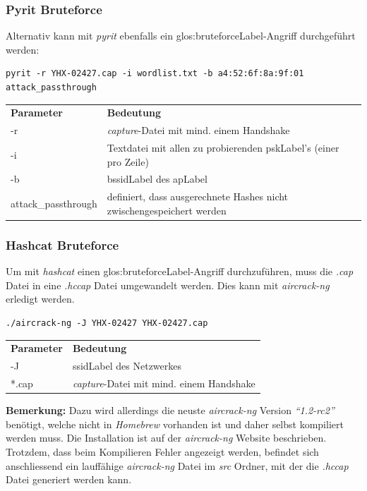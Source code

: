 \subsubsection{Pyrit Bruteforce}
Alternativ kann mit \textit{pyrit} ebenfalls ein \gls{glos:bruteforceLabel}-Angriff durchgeführt werden:
\begin{lstlisting}[style=lstStyleFramed]
pyrit -r YHX-02427.cap -i wordlist.txt -b a4:52:6f:8a:9f:01 attack_passthrough
\end{lstlisting}
\begin{tabular}{l l}
	\textbf{Parameter} & \textbf{Bedeutung}\\
	-r & \textit{capture}-Datei mit mind. einem Handshake\\
	-i	& Textdatei mit allen zu probierenden \gls{pskLabel}'s (einer pro Zeile)\\
	-b	& \gls{bssidLabel} des \gls{apLabel}\\
	attack\_passthrough & definiert, dass ausgerechnete Hashes nicht zwischengespeichert werden\\
\end{tabular}


\subsubsection{Hashcat Bruteforce}
Um mit \textit{hashcat} einen \gls{glos:bruteforceLabel}-Angriff durchzuführen, muss die \textit{.cap} Datei in eine \textit{.hccap} Datei umgewandelt werden. Dies kann mit \textit{aircrack-ng} erledigt werden.

\begin{lstlisting}[style=lstStyleFramed]
./aircrack-ng -J YHX-02427 YHX-02427.cap
\end{lstlisting}
\begin{tabular}{l l}
	\textbf{Parameter} & \textbf{Bedeutung}\\
	-J & \gls{ssidLabel} des Netzwerkes\\
	*.cap & \textit{capture}-Datei mit mind. einem Handshake\\
\end{tabular}

\begin{framed}
	\textbf{Bemerkung:} Dazu wird allerdings die neuste \textit{aircrack-ng} Version \textit{"`1.2-rc2"'} benötigt, welche nicht in \textit{Homebrew} vorhanden ist und daher selbst kompiliert werden muss. Die Installation ist auf der \textit{aircrack-ng} Website beschrieben.\\
	Trotzdem, dass beim Kompilieren Fehler angezeigt werden, befindet sich anschliessend ein lauffähige \textit{aircrack-ng} Datei im \textit{src} Ordner, mit der die \textit{.hccap} Datei generiert werden kann.
\end{framed}

